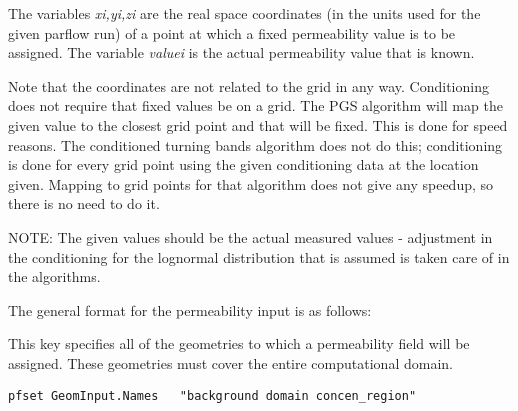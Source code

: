 The variables {\em xi,yi,zi} are the real space coordinates (in the
units used for the given parflow run) of
a point at which a fixed permeability value
is to be assigned. The variable {\em valuei} is the actual permeability
value that is known. 

Note that the coordinates
are not related to the grid in any way. Conditioning
does not require that fixed values be on a 
grid. The PGS algorithm
will map the given value to the closest grid point
and that will be fixed. This is done for speed reasons.
The conditioned turning bands algorithm does not do
this; conditioning is done for every grid point using
the given conditioning data at the location given.
Mapping to grid points for that algorithm does not give
any speedup, so there is no need to do it.

NOTE: The given values should be the actual measured
values - adjustment in the conditioning for the lognormal
distribution that is assumed is taken care of in the algorithms.

The general format for the permeability input is as follows:

{
This key specifies all of the geometries to which a permeability field 
will be assigned.  These geometries must cover the entire computational
domain.
}
\begin{display}\begin{verbatim}
pfset GeomInput.Names   "background domain concen_region"
\end{verbatim}\end{display}

